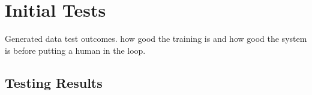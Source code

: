 \chapter{Initial Tests}
Generated data test outcomes.
how good the training is and how good the system is before putting a human in the loop.


\section{Testing Results}
